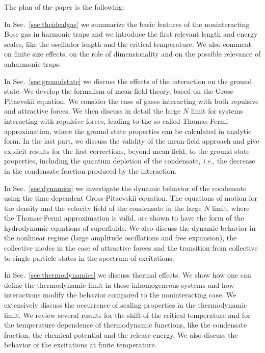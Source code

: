 The plan of the paper is the following:

In Sec.~\ref{sec:theidealgas}
we summarize the basic features of the noninteracting Bose gas in 
harmonic traps and we introduce the first relevant length and energy 
scales,  like the oscillator length and the critical temperature. 
We also comment on finite  size effects, on the role of dimensionality
and on the possible relevance of anharmonic traps.

In Sec.~\ref{sec:groundstate}
we discuss the effects of the interaction on the ground state. We 
develop the formalism of mean-field theory, based on the Gross-Pitaevskii 
equation. We consider the case of gases interacting  with  both repulsive 
and attractive forces. We then discuss in detail the large $N$ limit for 
systems interacting with repulsive forces, leading to the so called 
Thomas-Fermi approximation, where the ground state properties 
can be calculated in analytic form.  In the last part,  we discuss the
validity of the mean-field approach and give explicit results for 
the first corrections, beyond mean-field, to the ground state properties, 
including the quantum depletion of the condensate, {\it i.e.}, the
decrease in the condensate fraction produced by the interaction. 

In Sec.~\ref{sec:dynamics}
we investigate the dynamic behavior of the condensate using the time 
dependent Gross-Pitaevskii equation. The equations of motion for the
density and the velocity field of the condensate in the large $N$ limit,
where the Thomas-Fermi approximation is valid, are shown to have the 
form of the hydrodynamic equations of superfluids. 
We also discuss the dynamic behavior in the nonlinear regime (large
amplitude oscillations and free expansion), the collective modes in  
the case of attractive forces and the transition from collective to 
single-particle states in the spectrum of excitations. 

In Sec.~\ref{sec:thermodynamics}
we discuss thermal effects. We show how one can define the thermodynamic 
limit in these inhomogeneous systems and how interactions modify the 
behavior compared to the noninteracting case. We extensively discuss
the occurrence of scaling properties in the thermodynamic limit. We 
review several results for the shift of the 
critical temperature and for the temperature dependence of  
thermodynamic functions, like the condensate fraction, the chemical 
potential and the release energy. We also discuss the behavior of 
the excitations at finite temperature.

